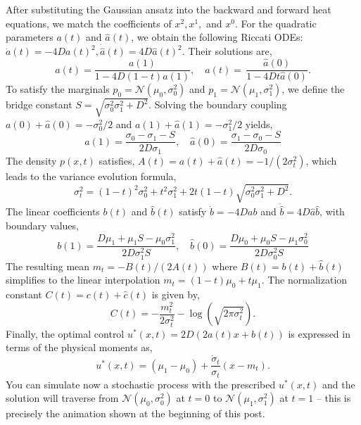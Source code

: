 \documentclass[12pt]{article}
\def\N{\mathcal{N}}
\begin{document}
\begin{singlespace}
\begin{tcolorbox}[breakable, enforce breakable, colback=gray!20!white, colframe=white,arc=8pt,outer arc=8pt]
After substituting the Gaussian ansatz into the backward and forward heat equations, we match the coefficients of $x^2, x^1,$ and $x^0$. For the quadratic parameters $a(t)$ and $\hat{a}(t)$, we obtain the following Riccati ODEs: $\dot{a}(t) = -4Da(t)^2, \dot{\hat{a}}(t) = 4D\hat{a}(t)^2$. Their solutions are,
\begin{equation*}
    a(t) =\frac{a(1)}{1 - 4D(1-t)a(1)}, \quad
    \hat{a}(t) =\,\frac{\hat{a}(0)}{1 - 4Dt\hat{a}(0)}.
\end{equation*}
To satisfy the marginals $p_0 = \mathcal{N}(\mu_0, \sigma^2_0)$ and $p_1 = \mathcal{N}(\mu_1, \sigma^2_1)$, we define the bridge constant $S = \sqrt{\sigma_0^2 \sigma_1^2 + D^2}$. Solving the boundary coupling $a(0) + \hat{a}(0) = -{\sigma_0^2}/{2}$ and $a(1) + \hat{a}(1) = -{\sigma_1^2}/{2}$ yields,
\begin{equation}
    a(1) = \frac{\sigma_0 - \sigma_1 - S}{2D\sigma_1}, \quad \hat{a}(0) = \frac{\sigma_1 - \sigma_0 - S}{2D\sigma_0}
\end{equation}
The density $p(x, t)$ satisfies, $A(t) = a(t) + \hat{a}(t) = -1/(2\sigma_t^2)$, which leads to the variance evolution formula,
\begin{equation}
    \sigma_t^2 = (1-t)^2 \sigma_0^2 + t^2 \sigma_1^2 + 2t(1-t)\sqrt{\sigma_0^2 \sigma_1^2 + D^2}.
\end{equation}
The linear coefficients $b(t)$ and $\hat{b}(t)$ satisfy $\dot{b} = -4Dab$ and $\dot{\hat{b}} = 4D\hat{a}\hat{b}$, with boundary values,
\begin{equation}
    b(1) = \frac{D\mu_1 + \mu_1 S - \mu_0 \sigma_1^2}{2 D \sigma_1^2 S}, \quad \hat{b}(0) = \frac{D\mu_0 + \mu_0 S - \mu_1 \sigma_0^2}{2 D \sigma_0^2 S}
\end{equation}
The resulting mean $m_t = -B(t) / (2A(t))$ where $B(t) = b(t) + \hat{b}(t)$ simplifies to the linear interpolation $m_t = (1-t)\mu_0 + t\mu_1$. The normalization constant $C(t) = c(t) + \hat{c}(t)$ is given by,
\begin{equation}
    C(t) = -\frac{m_t^2}{2\sigma_t^2} - \log(\sqrt{2\pi \sigma_t^2}).
\end{equation}
Finally, the optimal control $u^*(x, t) = 2D(2a(t)x + b(t))$ is expressed in terms of the physical moments as,
\begin{equation}
    u^*(x, t) = (\mu_1 - \mu_0) + \frac{\dot{\sigma}_t}{\sigma_t}(x - m_t).
\end{equation}
You can simulate now a stochastic process with the prescribed $u^*(x, t)$ and the solution will traverse from $\N(\mu_0, \sigma^2_0)$ at $t=0$ to $\N(\mu_1, \sigma^2_1)$ at $t=1$ -- this is precisely the animation shown at the beginning of this post.
\end{tcolorbox}

\end{singlespace}
\end{document}
